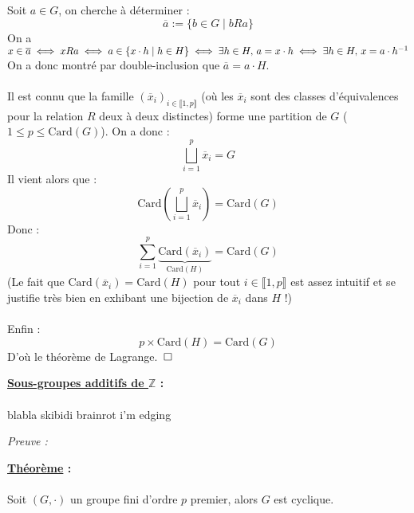 \documentclass{article}
\begin{document}
Soit $a \in G$, on cherche à déterminer :
$$\overline{a} := \{b \in G \mid bRa\}$$
On a $x \in \overline{a} \iff xRa \iff a \in \{x \cdot h \mid h \in H\} \iff \exists h \in H, \thinspace a = x \cdot h \iff \exists h \in H, \thinspace x = a \cdot h^{-1}$
On a donc montré par double-inclusion que $\overline{a} = a \cdot H$.\\
\\
Il est connu que la famille $(\overline{x}_i)_{i \in \llbracket 1, p \rrbracket}$ 
(où les $\overline{x}_i$ sont des classes d'équivalences pour la relation $R$ deux à deux distinctes) forme une partition de $G$ ($1 \leq p \leq \text{Card}(G)$).
On a donc :
$$\bigsqcup_{i = 1}^p \overline{x}_i = G$$
Il vient alors que :
$$\text{Card}(\bigsqcup_{i = 1}^p \overline{x}_i) = \text{Card}(G)$$
Donc :
$$\sum_{i = 1}^p \underbrace{\text{Card}(\overline{x}_i)}_{\text{Card}(H)} = \text{Card}(G)$$
(Le fait que $\text{Card}(\overline{x}_i) = \text{Card}(H)$ pour tout $i \in \llbracket 1, p \rrbracket$ est assez intuitif et se justifie très bien en exhibant une bijection de $\overline{x}_i$ dans $H$ !)\\
\\
Enfin :
$$p \times \text{Card}(H) = \text{Card}(G)$$
D'où le théorème de Lagrange. $\thinspace \square$

\newpage

\begin{tcolorbox}[colback=gray!10, colframe=black, boxrule=1.5pt, arc=0pt,
                  left=4pt, right=4pt, top=4pt, bottom=4pt,
                  leftrule=1.5pt, rightrule=0pt, toprule=0pt, bottomrule=0pt]
 \textbf{\underline{Sous-groupes additifs de $\mathbb{Z}$} :} \\
\\
 blabla skibidi brainrot i'm edging
\end{tcolorbox}

\textit{Preuve :}




\newpage

\begin{tcolorbox}[colback=gray!10, colframe=black, boxrule=1.5pt, arc=0pt,
                  left=4pt, right=4pt, top=4pt, bottom=4pt,
                  leftrule=1.5pt, rightrule=0pt, toprule=0pt, bottomrule=0pt]
 \textbf{\underline{Théorème} :} \\
\\
 Soit $(G, \cdot)$ un groupe fini d'ordre $p$ premier, alors $G$ est cyclique.
\end{tcolorbox}
\end{document}

